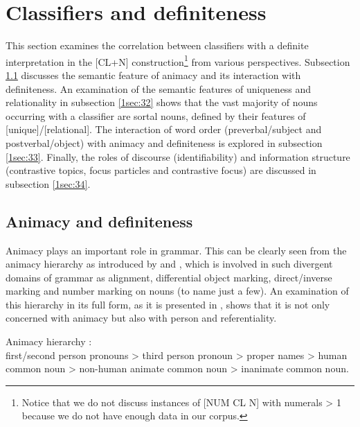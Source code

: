 \documentclass[output=paper]{langsci/langscibook}
\begin{document}
\section{Classifiers and definiteness}\label{1sec:3}

This section examines the correlation between classifiers with a definite interpretation in the [CL+N] construction\footnote{Notice that we do not discuss instances of [NUM CL N] with numerals > 1 because we do not have enough data in our corpus.} from various perspectives. Subsection \ref{1sec:31} discusses the semantic feature of animacy and its interaction with definiteness. An examination of the semantic features of uniqueness and relationality in subsection \ref{1sec:32} shows that the vast majority of nouns occurring with a classifier are sortal nouns, defined by their features of [\minus unique]/[\minus relational]. The interaction of word order (preverbal/subject and postverbal/object) with animacy and definiteness is explored in subsection \ref{1sec:33}. Finally, the roles of discourse (identifiability) and information structure (contrastive topics, focus particles and contrastive focus) are discussed in subsection \ref{1sec:34}.


\subsection{Animacy and definiteness}\label{1sec:31}

Animacy plays an important role in grammar. This can be clearly seen from the animacy hierarchy as introduced by \citet{silverstein:76} and \citet{dixon:79}, which is involved in such divergent domains of grammar as alignment, differential object marking, direct/inverse marking and number marking on nouns (to name just a few). An examination of this hierarchy in its full form, as it is presented in \citet[][130]{croft:03}, shows that it is not only concerned with animacy but also with person and referentiality.

\begin{exe}
\ex Animacy hierarchy \citep[][130]{croft:03}:\\
        first/second person pronouns > third person pronoun > proper names > human common
        noun > non-human animate common noun > inanimate common noun.
\end{exe}
\end{document}
